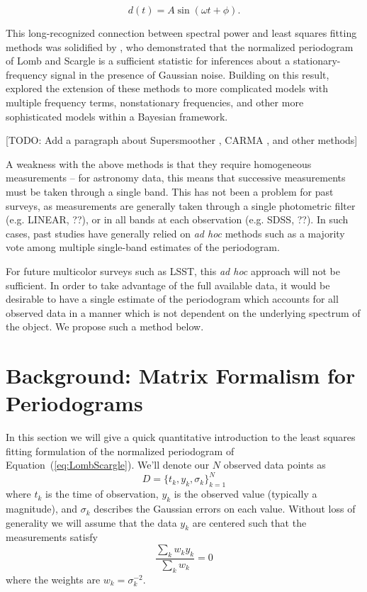 \documentclass[12pt,preprint]{aastex}
\newcommand{\todo}[1]{{\color{red} [TODO: #1]}}
\newcommand{\foreign}[1]{{\it #1}}
\newcommand{\adhoc}{\foreign{ad hoc}}
\newcommand{\Eq}[1]{Equation~(\ref{eq:#1})}
\newcommand{\eq}[1]{\Eq{#1}}
\newcommand{\eqlabel}[1]{\label{eq:#1}}
\begin{document}
\begin{equation}
  \eqlabel{SingleModel}
  d(t) = A\sin(\omega t + \phi).
\end{equation}

This long-recognized connection between spectral power and least squares fitting methods was solidified by \citep{Jaynes87}, who demonstrated that the normalized periodogram of Lomb and Scargle is a sufficient statistic for inferences about a stationary-frequency signal in the presence of Gaussian noise. Building on this result, \citep{Bretthorst88} explored the extension of these methods to more complicated models with multiple frequency terms, nonstationary frequencies, and other more sophisticated models within a Bayesian framework.

\todo{Add a paragraph about Supersmoother \citep{Reimann94}, CARMA \citep{Kelly14}, and other methods}

A weakness with the above methods is that they require homogeneous measurements -- for astronomy data, this means that successive measurements must be taken through a single band. This has not been a problem for past surveys, as measurements are generally taken through a single photometric filter (e.g. LINEAR, ??), or in all bands at each observation (e.g. SDSS, ??). In such cases, past studies have generally relied on \adhoc{} methods such as a majority vote among multiple single-band estimates of the periodogram.

For future multicolor surveys such as LSST, this \adhoc{} approach will not be sufficient. In order to take advantage of the full available data, it would be desirable to have a single estimate of the periodogram which accounts for all observed data in a manner which is not dependent on the underlying spectrum of the object. We propose such a method below.


\section{Background: Matrix Formalism for Periodograms}

In this section we will give a quick quantitative introduction to the least squares fitting formulation of the normalized periodogram of \eq{LombScargle}. We'll denote our $N$ observed data points as
\begin{equation}
  D = \{t_k, y_k, \sigma_k\}_{k=1}^N
\end{equation}
where $t_k$ is the time of observation, $y_k$ is the observed value (typically a magnitude), and $\sigma_k$ describes the Gaussian errors on each value. Without loss of generality we will assume that the data $y_k$ are centered such that the measurements satisfy
\begin{equation}
  \eqlabel{ycentered}
  \frac{\sum_k w_ky_k}{\sum_k w_k} = 0
\end{equation}
where the weights are $w_k = \sigma_k^{-2}$.
\end{document}
